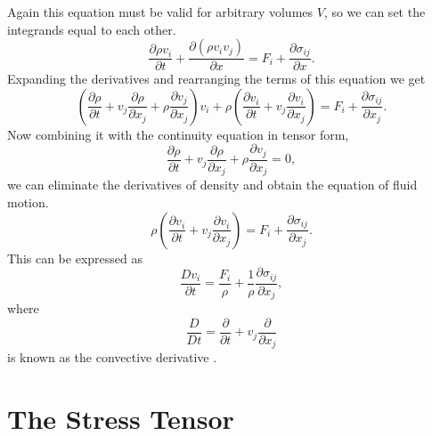 \documentclass[12pt, letter]{report}
\begin{document}
Again this equation must be valid for arbitrary volumes $V$, so we can set the integrands equal to each other.
\begin{equation}
\frac{\partial \rho v_i}{\partial t} + \frac{\partial (\rho v_i v_j)}{\partial x} = F_i + \frac{\partial \sigma_{ij}}{\partial x}.
\end{equation}
Expanding the derivatives and rearranging the terms of this equation we get
\begin{equation}
\left( \frac{\partial \rho}{\partial t} + v_j \frac{\partial \rho}{\partial x_j} + \rho \frac{\partial v_j}{\partial x_j} \right) v_i + \rho \left( \frac{\partial v_i}{\partial t} + v_j \frac{\partial v_i}{\partial x_j} \right) = F_i + \frac{\partial \sigma_{ij}}{\partial x_j}.
\end{equation}
Now combining it with the continuity equation in tensor form,
\begin{equation}
\frac{\partial \rho}{\partial t} + v_j \frac{\partial \rho}{\partial x_j} + \rho \frac{\partial v_j}{\partial x_j} = 0,
\end{equation}
we can eliminate the derivatives of density and obtain the equation of fluid motion.
\begin{equation}
\rho \left( \frac{\partial v_i}{\partial t} + v_j \frac{\partial v_i}{\partial x_j} \right) = F_i + \frac{\partial \sigma_{ij}}{\partial x_j}.
\end{equation}
This can be expressed as
\begin{equation}
\label{eq:momentum_transport}
\frac{D v_i}{\partial t} = \frac{F_i}{\rho} + \frac{1}{\rho}\frac{\partial \sigma_{ij}}{\partial x_j},
\end{equation}
where 
\begin{equation}
\frac{D}{Dt} = \frac{\partial }{\partial t} + v_j \frac{\partial }{\partial x_j}
\end{equation}
is known as the convective derivative \cite{Batchelor2000}. 

\section{The Stress Tensor}
\end{document}
